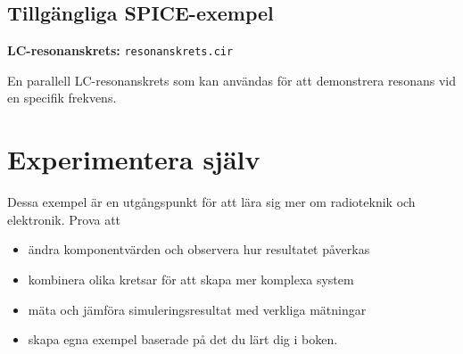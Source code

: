 \subsection{Tillgängliga SPICE-exempel}

\textbf{LC-resonanskrets:}
\texttt{resonanskrets.cir}

En parallell LC-resonanskrets som kan användas för att demonstrera
resonans vid en specifik frekvens.



\section{Experimentera själv}

Dessa exempel är en utgångspunkt för att lära sig mer om radioteknik och
elektronik.
Prova att

\begin{itemize}
\item ändra komponentvärden och observera hur resultatet påverkas
\item kombinera olika kretsar för att skapa mer komplexa system
\item mäta och jämföra simuleringsresultat med verkliga mätningar
\item skapa egna exempel baserade på det du lärt dig i boken.
\end{itemize}
